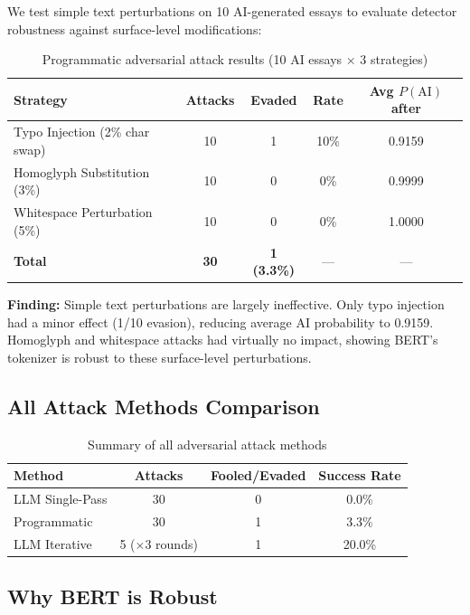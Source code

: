 \documentclass[11pt,a4paper]{article}
\begin{document}
We test simple text perturbations on 10 AI-generated essays to evaluate detector robustness against surface-level modifications:

\begin{table}[H]
\centering
\caption{Programmatic adversarial attack results (10 AI essays $\times$ 3 strategies)}
\label{tab:programmatic}
\begin{tabular}{lcccc}
\toprule
\textbf{Strategy} & \textbf{Attacks} & \textbf{Evaded} & \textbf{Rate} & \textbf{Avg $P(\text{AI})$ after} \\
\midrule
Typo Injection (2\% char swap)    & 10 & 1 & 10\% & 0.9159 \\
Homoglyph Substitution (3\%)     & 10 & 0 & 0\%  & 0.9999 \\
Whitespace Perturbation (5\%)    & 10 & 0 & 0\%  & 1.0000 \\
\midrule
\textbf{Total} & \textbf{30} & \textbf{1 (3.3\%)} & --- & --- \\
\bottomrule
\end{tabular}
\end{table}

\textbf{Finding:} Simple text perturbations are largely ineffective. Only typo injection had a minor effect (1/10 evasion), reducing average AI probability to 0.9159. Homoglyph and whitespace attacks had virtually no impact, showing BERT's tokenizer is robust to these surface-level perturbations.

\subsection{All Attack Methods Comparison}

\begin{table}[H]
\centering
\caption{Summary of all adversarial attack methods}
\label{tab:attack_summary}
\begin{tabular}{lccc}
\toprule
\textbf{Method} & \textbf{Attacks} & \textbf{Fooled/Evaded} & \textbf{Success Rate} \\
\midrule
LLM Single-Pass     & 30 & 0 & 0.0\% \\
Programmatic         & 30 & 1 & 3.3\% \\
LLM Iterative        & 5 ($\times$3 rounds) & 1 & 20.0\% \\
\bottomrule
\end{tabular}
\end{table}

\subsection{Why BERT is Robust}
\end{document}
